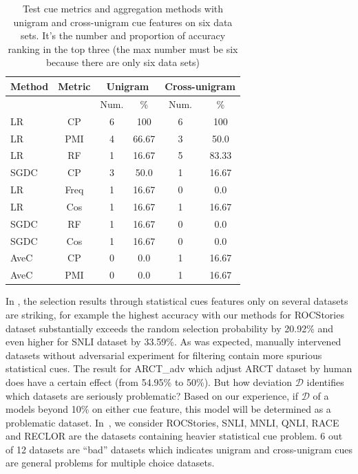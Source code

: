 \begin{table}[th]
 \scriptsize
\centering
\begin{tabular}{p{7mm}ccccc}
\hline
Method & Metric & \multicolumn{2}{c}{Unigram} &  \multicolumn{2}{c}{Cross-unigram}\\ \hline    
            &              & Num. & \%& Num.& \%\\ \hline    
LR&CP&  6 & 100& 6& 100 \\
LR&PMI  &4&66.67& 3 &50.0\\
LR&RF&  1 &  16.67&5& 83.33\\
SGDC&CP&3&50.0&1&16.67\\
LR&Freq &1&16.67&0&0.0\\
LR&Cos  & 1&16.67&1&16.67\\
SGDC&RF&1&16.67&0&0.0\\
SGDC&Cos&1&16.67&0&0.0\\
AveC&CP&0&0.0&1&16.67\\
AveC&PMI&0&0.0&1&16.67\\ \hline
\end{tabular}
\caption{\label{best_method} Test cue metrics and aggregation methods with unigram and cross-unigram cue features on six data sets. It's the number and proportion of accuracy ranking in the top three (the max number must be six because there are only six data sets)}
\end{table}

In , the selection
results through statistical cues features only on several datasets are striking, 
for example the highest accuracy with our methods for ROCStories dataset 
substantially exceeds the random selection probability by 20.92\% and even higher  for SNLI dataset 
by 33.59\%.  As was expected, 
manually intervened datasets without adversarial experiment 
for filtering contain more spurious statistical cues. 
The result for ARCT\_adv which adjust ARCT dataset by human does have a certain effect (from 54.95\% to 50\%).
But how deviation $\mathcal{D}$ identifies which datasets are seriously problematic? 
Based on our experience, if $\mathcal{D}$ of a models beyond 10\% on either cue feature, this model will be 
determined as a problematic dataset.
In~, we consider 
ROCStories, SNLI, MNLI, QNLI, RACE and RECLOR are the datasets containing heavier
statistical cue problem. 6 out of 12 datasets are ``bad'' datasets which 
indicates unigram and cross-unigram 
cues are general problems for multiple choice datasets. 


